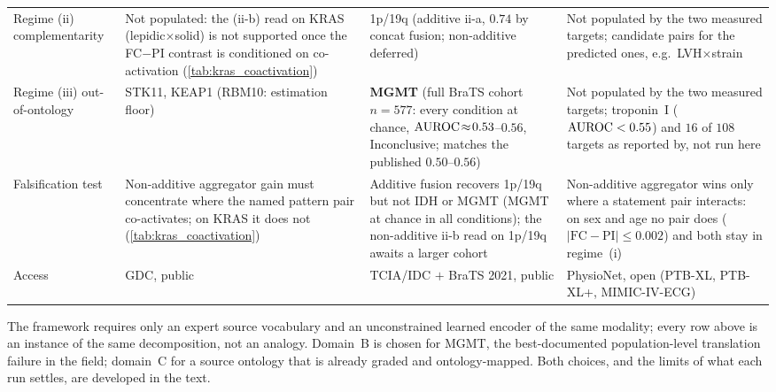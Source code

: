 \begin{tabularx}{\linewidth}{l X X X}
Regime (ii) complementarity
  & Not populated: the (ii-b) read on KRAS
    (lepidic$\times$solid) is not supported once the FC${-}$PI
    contrast is conditioned on co-activation
    (\cref{tab:kras_coactivation})
  & 1p/19q (additive ii-a, $0.74$ by concat fusion; non-additive deferred)
  & Not populated by the two measured targets; candidate pairs for the
    predicted ones, e.g.\ LVH$\times$strain \\
Regime (iii) out-of-ontology
  & STK11, KEAP1 (RBM10: estimation floor)
  & \textbf{MGMT} (full BraTS cohort $n\!=\!577$: every condition at chance,
    $\text{AUROC}\!\approx\!0.53$--$0.56$, Inconclusive; matches the published
    $0.50$--$0.56$)\cite{kim2022mgmtvalidation,robinet2023mgmt,saeed2023mgmt}
  & Not populated by the two measured targets; troponin~I
    ($\text{AUROC}<0.55$) and $16$ of $108$ targets as reported
    by\cite{xiao2025anyecglab}, not run here \\
\midrule
Falsification test
  & Non-additive aggregator gain must concentrate where the named
    pattern pair co-activates; on KRAS it does not
    (\cref{tab:kras_coactivation})
  & Additive fusion recovers 1p/19q but not IDH or MGMT (MGMT at chance
    in all conditions); the non-additive ii-b read on 1p/19q awaits a
    larger cohort
  & Non-additive aggregator wins only where a statement pair interacts:
    on sex and age no pair does
    ($\lvert\mathrm{FC}\!-\!\mathrm{PI}\rvert\!\leq\!0.002$) and both
    stay in regime~(i) \\
Access
  & GDC, public
  & TCIA/IDC $+$ BraTS 2021, public
  & PhysioNet, open (PTB-XL, PTB-XL+, MIMIC-IV-ECG) \\
\bottomrule
\end{tabularx}
\begin{flushleft}\footnotesize
The framework requires only an expert source vocabulary and an
unconstrained learned encoder of the same modality; every row above
is an instance of the same decomposition, not an analogy.
Domain~B is chosen for MGMT, the best-documented population-level
translation failure in the field; domain~C for a source ontology that is
already graded and ontology-mapped. Both choices, and the limits of what
each run settles, are developed in the text.
\end{flushleft}
